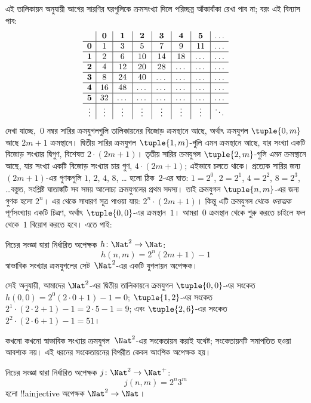 \documentclass[../../../include/open-logic-section]{subfiles}
\begin{document}
\begin{explain}
\[\]
এই তালিকায়ন অনুযায়ী আগের সারণির ঘরগুলিকে ক্রমসংখ্যা দিলে পরিচ্ছন্ন আঁকাবাঁকা রেখা পাব না; বরং এই বিন্যাস পাব:
\[
\begin{array}{ c | c | c | c | c | c | c | c }
& \mathbf 0 & \mathbf 1 & \mathbf 2 & \mathbf 3 & \mathbf 4 & \mathbf 5 & \dots \\
\hline
\mathbf 0 & 1 & 3 & 5 & 7 & 9 & 11 & \dots \\
\hline
\mathbf 1 & 2 & 6 & 10 & 14 & 18 & \dots & \dots \\
\hline
\mathbf 2 & 4 & 12 & 20 & 28 & \dots & \dots & \dots \\
\hline
\mathbf 3 & 8 & 24 & 40 & \dots & \dots & \dots & \dots \\
\hline
\mathbf 4 & 16 & 48 & \dots & \dots & \dots & \dots & \dots \\
\hline
\mathbf 5 & 32 & \dots & \dots & \dots & \dots & \dots & \dots \\
\hline
\vdots & \vdots & \vdots & \vdots & \vdots & \vdots & \vdots & \ddots\\
\end{array}
\]
দেখা যাচ্ছে,~$0$ নম্বর সারির ক্রমযুগলগুলি তালিকায়নের বিজোড় ক্রমস্থানে আছে, অর্থাৎ ক্রমযুগল $\tuple{0,m}$ আছে $2m+1$ ক্রমস্থানে। দ্বিতীয় সারির ক্রমযুগল $\tuple{1,m}$-গুলি এমন ক্রমস্থানে আছে, যার সংখ্যা একটি বিজোড় সংখ্যার দ্বিগুণ, বিশেষত $2 \cdot (2m+1)$। তৃতীয় সারির ক্রমযুগল $\tuple{2,m}$-গুলি এমন ক্রমস্থানে আছে, যার সংখ্যা একটি বিজোড় সংখ্যার চার গুণ, $4 \cdot (2m+1)$; এইভাবে চলতে থাকে। প্রত্যেক সারির জন্য $(2m+1)$-এর গুণকগুলি $1$, $2$, $4$, $8$, \dots{} হলো ঠিক~$2$-এর ঘাত: $1= 2^0$, $2 = 2^1$, $4 = 2^2$, $8 = 2^3$, \dots\@ বস্তুত, সংশ্লিষ্ট ঘাতাঙ্কটি সব সময় আলোচ্য ক্রমযুগলের প্রথম সদস্য। তাই ক্রমযুগল $\tuple{n,m}$-এর জন্য গুণক হলো $2^n$। এর থেকে সাধারণ সূত্র পাওয়া যায়: $2^n \cdot (2m+1)$। কিন্তু এটি ক্রমযুগল থেকে \emph{ধনাত্মক} পূর্ণসংখ্যায় একটি চিত্রণ, অর্থাৎ $\tuple{0,0}$-এর ক্রমস্থান~$1$। আমরা~$0$ ক্রমস্থান থেকে শুরু করতে চাইলে ফল থেকে~$1$ বিয়োগ করতে হবে। এতে পাই:
\end{explain}

\begin{ex}
নিচের সংজ্ঞা দ্বারা নির্ধারিত অপেক্ষক $h\colon \Nat^2 \to \Nat$:
\[
h(n,m) = 2^n (2m+1) - 1
\]
স্বাভাবিক সংখ্যার ক্রমযুগলের সেট~$\Nat^2$-এর একটি যুগলায়ন অপেক্ষক।
\end{ex}

\begin{explain}
সেই অনুযায়ী, আমাদের $\Nat^2$-এর দ্বিতীয় তালিকায়নে ক্রমযুগল $\tuple{0,0}$-এর সংকেত $h(0,0) = 2^0(2\cdot 0+1) - 1 = 0$;
$\tuple{1,2}$-এর সংকেত $2^{1} \cdot (2 \cdot 2 + 1) - 1 = 2
\cdot 5 - 1 = 9$; এবং $\tuple{2,6}$-এর সংকেত $2^{2} \cdot (2
\cdot 6 + 1) - 1 = 51$।
\end{explain}

কখনো কখনো স্বাভাবিক সংখ্যার ক্রমযুগল~$\Nat^2$-এর সংকেতায়ন করাই যথেষ্ট; সংকেতায়নটি সমাপতিত হওয়া আবশ্যক নয়। এই ধরনের সংকেতায়নের বিপরীত কেবল আংশিক অপেক্ষক হয়।

\begin{ex}
নিচের সংজ্ঞা দ্বারা নির্ধারিত অপেক্ষক $j\colon \Nat^2 \to \Nat^+$:
\[
j(n,m) = 2^n3^m
\]
হলো !!a{injective} অপেক্ষক $\Nat^2 \to \Nat$।
\end{ex}
\end{document}

